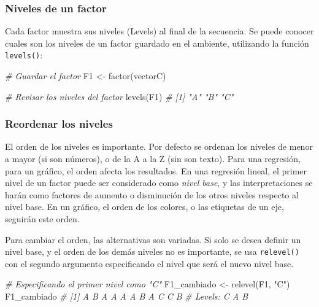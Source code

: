 \documentclass[
]{article}
\newenvironment{Shaded}{\begin{snugshade}}{\end{snugshade}}
\newcommand{\CommentTok}[1]{\textcolor[rgb]{0.56,0.35,0.01}{\textit{#1}}}
\newcommand{\FunctionTok}[1]{\textcolor[rgb]{0.00,0.00,0.00}{#1}}
\newcommand{\NormalTok}[1]{#1}
\newcommand{\OtherTok}[1]{\textcolor[rgb]{0.56,0.35,0.01}{#1}}
\newcommand{\StringTok}[1]{\textcolor[rgb]{0.31,0.60,0.02}{#1}}
\theoremstyle{definition}
\theoremstyle{definition}
\theoremstyle{definition}
\theoremstyle{definition}
\theoremstyle{remark}
\begin{document}
\hypertarget{niveles-de-un-factor}{%
\subsubsection{Niveles de un factor}\label{niveles-de-un-factor}}

Cada factor muestra sus niveles (Levels) al final de la secuencia. Se puede conocer cuales son los niveles de un factor guardado en el ambiente, utilizando la función \texttt{levels()}:

\begin{Shaded}
\begin{Highlighting}[]
\CommentTok{\# Guardar el factor}
\NormalTok{F1 }\OtherTok{\textless{}{-}} \FunctionTok{factor}\NormalTok{(vectorC)}

\CommentTok{\# Revisar los niveles del factor}
\FunctionTok{levels}\NormalTok{(F1)}
\CommentTok{\# [1] "A" "B" "C"}
\end{Highlighting}
\end{Shaded}

\hypertarget{reordenar-los-niveles}{%
\subsubsection{Reordenar los niveles}\label{reordenar-los-niveles}}

El orden de los niveles es importante. Por defecto se ordenan los niveles de menor a mayor (si son números), o de la A a la Z (sin son texto). Para una regresión, para un gráfico, el orden afecta los resultados. En una regresión lineal, el primer nivel de un factor puede ser considerado como \emph{nivel base}, y las interpretaciones se harán como factores de aumento o disminución de los otros niveles respecto al nivel base. En un gráfico, el orden de los colores, o las etiquetas de un eje, seguirán este orden.

Para cambiar el orden, las alternativas son variadas. Si solo se desea definir un nivel base, y el orden de los demás niveles no es importante, se usa \texttt{relevel()} con el segundo argumento especificando el nivel que será el nuevo nivel base.

\begin{Shaded}
\begin{Highlighting}[]
\CommentTok{\# Especificando el primer nivel como "C" }
\NormalTok{F1\_cambiado }\OtherTok{\textless{}{-}} \FunctionTok{relevel}\NormalTok{(F1, }\StringTok{"C"}\NormalTok{)}
\NormalTok{F1\_cambiado}
\CommentTok{\#  [1] A B A A A A B A C C B}
\CommentTok{\# Levels: C A B}
\end{Highlighting}
\end{Shaded}
\end{document}
